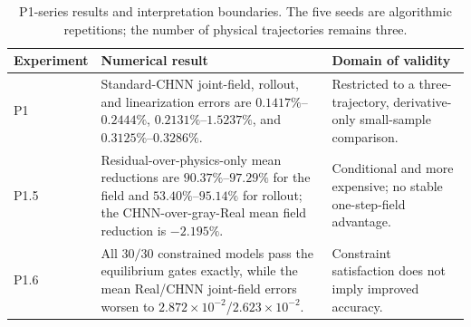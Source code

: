 \begin{table}[htbp]
\centering
\caption{P1-series results and interpretation boundaries. The five seeds are algorithmic repetitions; the number of physical trajectories remains three.}
\label{tab:p1-series-summary}
\small
\begin{tabularx}{\textwidth}{@{}l>{\raggedright\arraybackslash}X>{\raggedright\arraybackslash}X@{}}
\toprule
Experiment & Numerical result & Domain of validity \\
\midrule
P1 &
Standard-CHNN joint-field, rollout, and linearization errors are \(0.1417\%\)--\(0.2444\%\), \(0.2131\%\)--\(1.5237\%\), and \(0.3125\%\)--\(0.3286\%\). &
Restricted to a three-trajectory, derivative-only small-sample comparison. \\
P1.5 &
Residual-over-physics-only mean reductions are \(90.37\%\)--\(97.29\%\) for the field and \(53.40\%\)--\(95.14\%\) for rollout; the CHNN-over-gray-Real mean field reduction is \(-2.195\%\). &
Conditional and more expensive; no stable one-step-field advantage. \\
P1.6 &
All \(30/30\) constrained models pass the equilibrium gates exactly, while the mean Real/CHNN joint-field errors worsen to \(2.872\times10^{-2}\)/\(2.623\times10^{-2}\). &
Constraint satisfaction does not imply improved accuracy. \\
\bottomrule
\end{tabularx}
\end{table}
